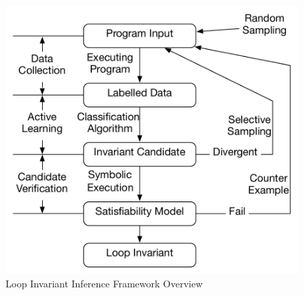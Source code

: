 \begin{figure}[t]
    \centering
    \includegraphics[scale=0.45]{figures/overview.pdf}
    \caption{Loop Invariant Inference Framework Overview}
    \label{fig:overview}
\end{figure}

